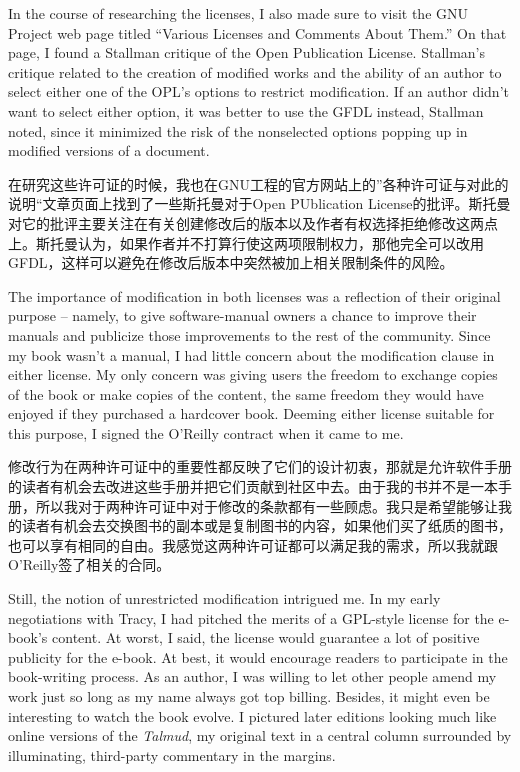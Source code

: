 \ifdefined\eng
In the course of researching the licenses, I also made sure to visit the GNU Project web page titled ``Various Licenses and Comments About Them.'' On that page, I found a Stallman critique of the Open Publication License. Stallman's critique related to the creation of modified works and the ability of an author to select either one of the OPL's options to restrict modification. If an author didn't want to select either option, it was better to use the GFDL instead, Stallman noted, since it minimized the risk of the nonselected options popping up in modified versions of a document.
\fi

\ifdefined\chs
在研究这些许可证的时候，我也在GNU工程的官方网站上的”各种许可证与对此的说明“文章页面上找到了一些斯托曼对于Open PUblication License的批评。斯托曼对它的批评主要关注在有关创建修改后的版本以及作者有权选择拒绝修改这两点上。斯托曼认为，如果作者并不打算行使这两项限制权力，那他完全可以改用GFDL，这样可以避免在修改后版本中突然被加上相关限制条件的风险。
\fi

\ifdefined\eng
The importance of modification in both licenses was a reflection of their original purpose -- namely, to give software-manual owners a chance to improve their manuals and publicize those improvements to the rest of the community. Since my book wasn't a manual, I had little concern about the modification clause in either license. My only concern was giving users the freedom to exchange copies of the book or make copies of the content, the same freedom they would have enjoyed if they purchased a hardcover book. Deeming either license suitable for this purpose, I signed the O'Reilly contract when it came to me.
\fi

\ifdefined\chs
修改行为在两种许可证中的重要性都反映了它们的设计初衷，那就是允许软件手册的读者有机会去改进这些手册并把它们贡献到社区中去。由于我的书并不是一本手册，所以我对于两种许可证中对于修改的条款都有一些顾虑。我只是希望能够让我的读者有机会去交换图书的副本或是复制图书的内容，如果他们买了纸质的图书，也可以享有相同的自由。我感觉这两种许可证都可以满足我的需求，所以我就跟O'Reilly签了相关的合同。
\fi

\ifdefined\eng
Still, the notion of unrestricted modification intrigued me. In my early negotiations with Tracy, I had pitched the merits of a GPL-style license for the e-book's content. At worst, I said, the license would guarantee a lot of positive publicity for the e-book. At best, it would encourage readers to participate in the book-writing process. As an author, I was willing to let other people amend my work just so long as my name always got top billing. Besides, it might even be interesting to watch the book evolve. I pictured later editions looking much like online versions of the \textit{Talmud}, my original text in a central column surrounded by illuminating, third-party commentary in the margins.
\fi

